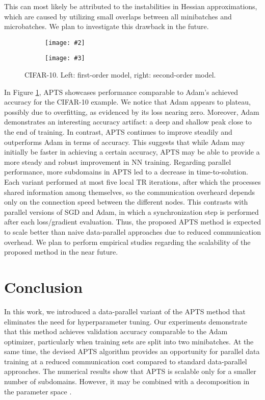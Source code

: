 \documentclass{article}
\newcommand{\customsubfigure}[3]{%
    \begin{subfigure}[b]{0.495\textwidth}
        \texttt{[image: \#2]}
    \end{subfigure}
    \begin{subfigure}[b]{0.495\textwidth}
        \texttt{[image: \#3]}
    \end{subfigure}
    \vspace{-1em}
    \caption*{#1}
}
\begin{document}
This can most likely be attributed to the instabilities in Hessian approximations, which are caused by utilizing small overlaps between all minibatches and microbatches.
We plan to investigate this drawback in the future.

\begin{figure}
    \customsubfigure{}{./figures/APTS_D_ord1-CIFAR10-mb10000-overlap0_05-net1_accuracy_loss.png}{./figures/APTS_D_ord2-CIFAR10-mb10000-overlap0_05-net1_accuracy_loss.png}
    \vspace{-2em}
    \caption{CIFAR-10. Left: first-order model, right: second-order model.}
  \label{fig:cifar10_apts_d}
\end{figure}

In Figure \ref{fig:cifar10_apts_d}, APTS showcases performance comparable to Adam's achieved accuracy for the CIFAR-10 example. 
We notice that Adam appears to plateau, possibly due to overfitting, as evidenced by its loss nearing zero. 
Moreover, Adam demonstrates an interesting accuracy artifact: a deep and shallow peak close to the end of training. 
In contrast, APTS continues to improve steadily and outperforms Adam in terms of accuracy. This suggests that while Adam may initially be faster in achieving a certain accuracy, APTS may be able to provide a more steady and robust improvement in NN training. Regarding parallel performance, more subdomains in APTS led to a decrease in time-to-solution. Each variant performed at most five local TR iterations, after which the processes shared information among themselves, so the communication overheard depends only on the connection speed between the different nodes. This contrasts with parallel versions of SGD and Adam, in which a synchronization step is performed after each loss/gradient evaluation. Thus, the proposed APTS method is expected to scale better than naive data-parallel approaches due to reduced communication overhead. We plan to perform empirical studies regarding the scalability of the proposed method in the near future.

\section{Conclusion}
In this work, we introduced a data-parallel variant of the APTS method that eliminates the need for hyperparameter tuning. 
Our experiments demonstrate that this method achieves validation accuracy comparable to the Adam optimizer, particularly when training sets are split into two minibatches. 
At the same time, the devised APTS algorithm provides an opportunity for parallel data training at a reduced communication cost compared to standard data-parallel approaches. The numerical results show that APTS is scalable only for a smaller number of subdomains. However, it may be combined with a decomposition in the parameter space \cite{trottiEtAl2023}. 
\end{document}
